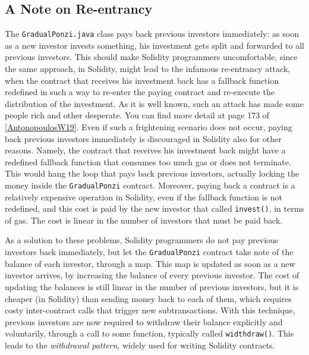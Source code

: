 \documentclass[a4paper,]{book}
\begin{document}
{\hypertarget{a-note-on-re-entrancy}{%
\subsection{A Note on Re-entrancy }\label{a-note-on-re-entrancy}}

The \texttt{GradualPonzi.java} class pays back previous investors
immediately: as soon as a new investor invests something, his investment
gets split and forwarded to all previous investors. This should make
Solidity programmers uncomfortable, since the same approach, in
Solidity, might lead to the infamous re-entrancy attack, when the
contract that receives his investment back has a fallback function
redefined in such a way to re-enter the paying contract and re-execute
the distribution of the investment. As it is well known, such an attack
has made some people rich and other desperate. You can find more detail
at page 173 of
\protect\hyperlink{AntonopoulosW19}{{[}AntonopoulosW19{]}}. Even if such
a frightening scenario does not occur, paying back previous investors
immediately is discouraged in Solidity also for other reasons. Namely,
the contract that receives his investment back might have a redefined
fallback function that consumes too much gas or does not terminate. This
would hang the loop that pays back previous investors, actually locking
the money inside the \texttt{GradualPonzi} contract. Moreover, paying
back a contract is a relatively expensive operation in Solidity, even if
the fallback function is not redefined, and this cost is paid by the new
investor that called \texttt{invest()}, in terms of gas. The cost is
linear in the number of investors that must be paid back.

As a solution to these problems, Solidity programmers do not pay
previous investors back immediately, but let the \texttt{GradualPonzi}
contract take note of the balance of each investor, through a map. This
map is updated as soon as a new investor arrives, by increasing the
balance of every previous investor. The cost of updating the balances is
still linear in the number of previous investors, but it is cheaper (in
Solidity) than sending money back to each of them, which requires costy
inter-contract calls that trigger new subtransactions. With this
technique, previous investors are now required to withdraw their balance
explicitly and voluntarily, through a call to some function, typically
called \texttt{widthdraw()}. This leads to the \emph{withdrawal
pattern}, widely used for writing Solidity contracts.

}
\end{document}
